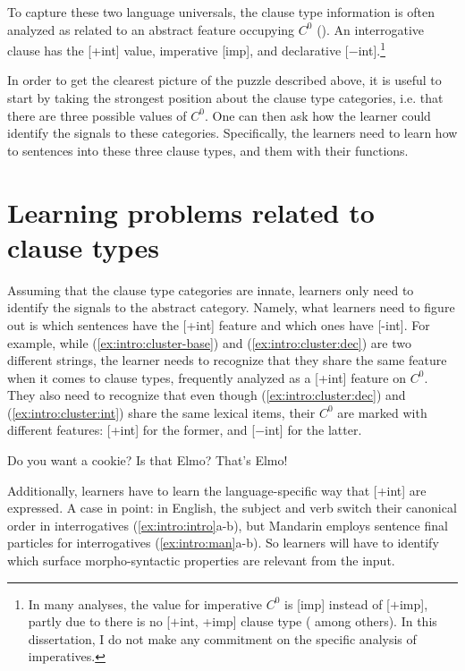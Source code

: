 To capture these two language universals, the clause type information is often analyzed as related to an abstract feature occupying $C^{0}$ (\cite{chomsky1995minimalist, cheng1991, rizzi1997, rizzi2001int, chomskylasnik1977,platzack1997imp,akmajian1984clausetype, han1998imp}). An interrogative clause has the [+int] value, imperative [imp], and declarative [$-$int].\footnote{In many analyses, the value for imperative $C^{0}$ is [imp] instead of [$+$imp], partly due to there is no [$+$int, +imp] clause type (\cite{platzack1997imp,han1998imp} among others). In this dissertation, I do not make any commitment on the specific analysis of imperatives.} 




In order to get the clearest picture of the puzzle described above, it is useful to start by taking the strongest position about the clause type categories, i.e. that there are three possible values of $C^{0}$. One can then ask how the learner could identify the signals to these categories. Specifically, the learners need to learn how to  sentences into these three clause types, and  them with their functions. 

\section{Learning problems related to clause types}


Assuming that the clause type categories are innate, learners only need to identify the signals to the abstract category. Namely, what learners need to figure out is which sentences have the [+int] feature and which ones have [-int]. 
For example, while (\ref{ex:intro:cluster-base}) and (\ref{ex:intro:cluster:dec}) are two different strings, the learner needs to recognize that they share the same feature when it comes to clause types, frequently analyzed as a [+int] feature on $C^{0}$. They also need to recognize that even though (\ref{ex:intro:cluster:dec}) and (\ref{ex:intro:cluster:int}) share the same lexical items, their $C^{0}$ are marked with different features: [+int] for the former, and [$-$int] for the latter.


Do you want a cookie?
\eex
{}
\bxl\label{ex:intro:cluster:int}
Is that Elmo?
\ex\label{ex:intro:cluster:dec}
That’s Elmo!
\exl
\eex


Additionally, learners have to learn the language-specific way that [+int] are expressed. A case in point: in English, the subject and verb switch their canonical order in interrogatives (\ref{ex:intro:intro}a-b), but Mandarin employs sentence final particles for interrogatives (\ref{ex:intro:man}a-b). So learners will have to identify which surface morpho-syntactic properties are relevant from the input.  


